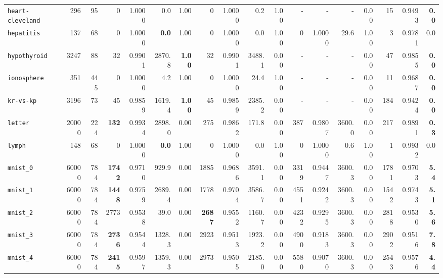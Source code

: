 \begin{tabular}{lccrrrrrrrrrrrrrrr}
\texttt{heart-cleveland} & \multicolumn{1}{r}{296} & \multicolumn{1}{r}{95}  & 0 & 1.0000 & 0.0 & 1.00 & 0 & 1.0000 & 0.2 & 1.00 & - & - & - & 0.00 & 15 & 0.9493 & \textbf{0.0}\\
\texttt{hepatitis} & \multicolumn{1}{r}{137} & \multicolumn{1}{r}{68}  & 0 & 1.0000 & \textbf{0.0} & 1.00 & 0 & 1.0000 & 0.0 & 1.00 & 0 & 1.0000 & 29.6 & 1.00 & 3 & 0.9781 & 0.0\\
\texttt{hypothyroid} & \multicolumn{1}{r}{3247} & \multicolumn{1}{r}{88}  & 32 & 0.9901 & 2870.8 & \textbf{1.00} & 32 & 0.9901 & 3488.1 & 0.00 & - & - & - & 0.00 & 47 & 0.9855 & \textbf{0.0}\\
\texttt{ionosphere} & \multicolumn{1}{r}{351} & \multicolumn{1}{r}{445}  & 0 & 1.0000 & 4.2 & 1.00 & 0 & 1.0000 & 24.4 & 1.00 & - & - & - & 0.00 & 11 & 0.9687 & \textbf{0.0}\\
\texttt{kr-vs-kp} & \multicolumn{1}{r}{3196} & \multicolumn{1}{r}{73}  & 45 & 0.9859 & 1619.4 & \textbf{1.00} & 45 & 0.9859 & 2385.2 & 0.00 & - & - & - & 0.00 & 184 & 0.9424 & \textbf{0.0}\\
\texttt{letter} & \multicolumn{1}{r}{20000} & \multicolumn{1}{r}{224}  & \textbf{132} & 0.9934 & 2898.0 & 0.00 & 275 & 0.9862 & 171.8 & 0.00 & 387 & 0.9807 & 3600.0 & 0.00 & 217 & 0.9891 & \textbf{0.3}\\
\texttt{lymph} & \multicolumn{1}{r}{148} & \multicolumn{1}{r}{68}  & 0 & 1.0000 & \textbf{0.0} & 1.00 & 0 & 1.0000 & 0.0 & 1.00 & 0 & 1.0000 & 0.6 & 1.00 & 1 & 0.9932 & 0.0\\
\texttt{mnist\_0} & \multicolumn{1}{r}{60000} & \multicolumn{1}{r}{784}  & \textbf{1742} & 0.9710 & 929.9 & 0.00 & 1885 & 0.9686 & 3591.1 & 0.00 & 3319 & 0.9447 & 3600.3 & 0.00 & 1781 & 0.9703 & \textbf{5.4}\\
\texttt{mnist\_1} & \multicolumn{1}{r}{60000} & \multicolumn{1}{r}{784}  & \textbf{1448} & 0.9759 & 2689.4 & 0.00 & 1778 & 0.9704 & 3586.7 & 0.00 & 4551 & 0.9242 & 3600.3 & 0.00 & 1542 & 0.9743 & \textbf{5.1}\\
\texttt{mnist\_2} & \multicolumn{1}{r}{60000} & \multicolumn{1}{r}{784}  & 2773 & 0.9538 & 39.0 & 0.00 & \textbf{2687} & 0.9552 & 1160.7 & 0.00 & 4232 & 0.9295 & 3600.3 & 0.00 & 2818 & 0.9530 & \textbf{5.6}\\
\texttt{mnist\_3} & \multicolumn{1}{r}{60000} & \multicolumn{1}{r}{784}  & \textbf{2736} & 0.9544 & 1328.3 & 0.00 & 2923 & 0.9513 & 1923.2 & 0.00 & 4900 & 0.9183 & 3600.3 & 0.00 & 2902 & 0.9516 & \textbf{7.8}\\
\texttt{mnist\_4} & \multicolumn{1}{r}{60000} & \multicolumn{1}{r}{784}  & \textbf{2415} & 0.9597 & 1359.3 & 0.00 & 2973 & 0.9505 & 2185.0 & 0.00 & 5580 & 0.9070 & 3600.3 & 0.00 & 2543 & 0.9576 & \textbf{4.4}\\

\end{tabular}
